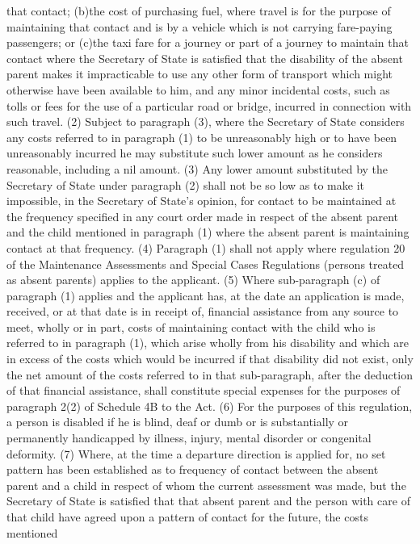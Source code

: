 \documentclass[a4paper]{article}
\begin{document}
that contact;
(b)the cost of purchasing fuel, where travel is for the purpose of maintaining
that contact and is by a vehicle which is not carrying fare-paying passengers;
or
(c)the taxi fare for a journey or part of a journey to maintain that contact
where the Secretary of State is satisfied that the disability of the absent
parent makes it impracticable to use any other form of transport which might
otherwise have been available to him,
and any minor incidental costs, such as tolls or fees for the use of a
particular road or bridge, incurred in connection with such travel.
(2) Subject to paragraph (3), where the Secretary of State considers any costs
referred to in paragraph (1) to be unreasonably high or to have been
unreasonably incurred he may substitute such lower amount as he considers
reasonable, including a nil amount.
(3) Any lower amount substituted by the Secretary of State under paragraph (2)
shall not be so low as to make it impossible, in the Secretary of State’s
opinion, for contact to be maintained at the frequency specified in any court
order made in respect of the absent parent and the child mentioned in paragraph
(1) where the absent parent is maintaining contact at that frequency.
(4) Paragraph (1) shall not apply where regulation 20 of the Maintenance
Assessments and Special Cases Regulations (persons treated as absent parents)
applies to the applicant.
(5) Where sub-paragraph (c) of paragraph (1) applies and the applicant has, at
the date an application is made, received, or at that date is in receipt of,
financial assistance from any source to meet, wholly or in part, costs of
maintaining contact with the child who is referred to in paragraph (1), which
arise wholly from his disability and which are in excess of the costs which
would be incurred if that disability did not exist, only the net amount of the
costs referred to in that sub-paragraph, after the deduction of that financial
assistance, shall constitute special expenses for the purposes of paragraph 2(2)
of Schedule 4B to the Act.
(6) For the purposes of this regulation, a person is disabled if he is blind,
deaf or dumb or is substantially or permanently handicapped by illness, injury,
mental disorder or congenital deformity.
(7) Where, at the time a departure direction is applied for, no set pattern has
been established as to frequency of contact between the absent parent and a
child in respect of whom the current assessment was made, but the Secretary of
State is satisfied that that absent parent and the person with care of that
child have agreed upon a pattern of contact for the future, the costs mentioned
\end{document}
